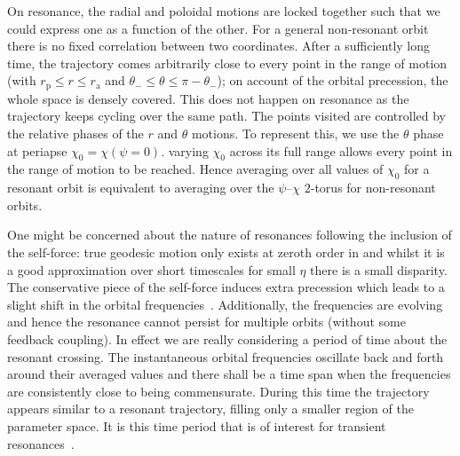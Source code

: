 \documentclass[aps,prd,amsfonts,amssymb,amsmath,nofootinbib,reprint,showpacs]{revtex4-1}
\newcommand{\sub}[1]{\ensuremath{_\text{#1}}}
\begin{document}
On resonance, the radial and poloidal motions are locked together such that we could express one as a function of the other. For a general non-resonant orbit there is no fixed correlation between two coordinates. After a sufficiently long time, the trajectory comes arbitrarily close to every point in the range of motion (with $r\sub{p} \leq r \leq r\sub{a}$ and $\theta_- \leq \theta \leq \pi - \theta_-$); on account of the orbital precession, the whole space is densely covered. This does not happen on resonance as the trajectory keeps cycling over the same path. The points visited are controlled by the relative phases of the $r$ and $\theta$ motions. To represent this, we use the $\theta$ phase at periapse $\chi_0 = \chi(\psi = 0)$. varying $\chi_0$ across its full range allows every point in the range of motion to be reached. Hence averaging over all values of $\chi_0$ for a resonant orbit is equivalent to averaging over the $\psi$--$\chi$ $2$-torus for non-resonant orbits.

One might be concerned about the nature of resonances following the inclusion of the self-force: true geodesic motion only exists at zeroth order in and whilst it is a good approximation over short timescales for small $\eta$ there is a small disparity. The conservative piece of the self-force induces extra precession which leads to a slight shift in the orbital frequencies~\cite{Warburton2012}. Additionally, the frequencies are evolving and hence the resonance cannot persist for multiple orbits (without some feedback coupling). In effect we are really considering a period of time about the resonant crossing. The instantaneous orbital frequencies oscillate back and forth around their averaged values and there shall be a time span when the frequencies are consistently close to being commensurate. During this time the trajectory appears similar to a resonant trajectory, filling only a smaller region of the parameter space. It is this time period that is of interest for transient resonances~\cite{Bosley1992}.

\end{document}
